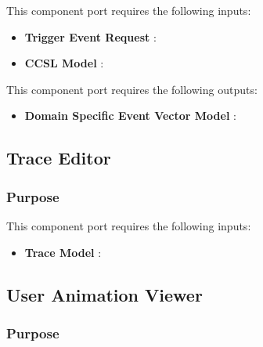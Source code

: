 \documentclass{gemoc} %
\begin{document}
This component port requires the following inputs:
\begin{itemize}
  \item \textbf{Trigger Event Request} :
  \item \textbf{CCSL Model} :
\end{itemize}

This component port requires the following outputs:
\begin{itemize}
  \item \textbf{Domain Specific Event Vector Model} :
\end{itemize}

\subsection{Trace Editor}


\subsubsection{Purpose}

This component port requires the following inputs:
\begin{itemize}
  \item \textbf{Trace Model} :
\end{itemize}


\subsection{User Animation Viewer}


\subsubsection{Purpose}

\end{document}
